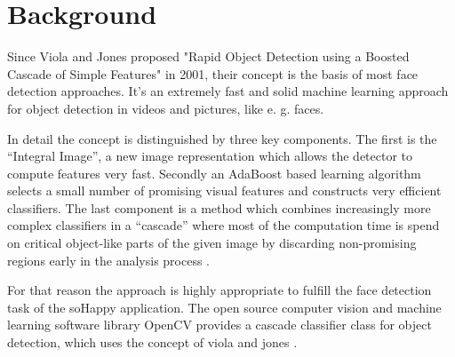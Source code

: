 \section{Background} \label{sec:background}
Since Viola and Jones proposed "Rapid Object Detection using a Boosted Cascade of Simple Features" in 2001, their concept is the basis of most face detection approaches.
It's an extremely fast and solid machine learning approach for object detection in videos and pictures, like e. g. faces.

In detail the concept is distinguished by three key components.
The first is the “Integral Image”, a new image representation which allows the detector to compute features very fast.
Secondly an AdaBoost based learning algorithm selects a small number of promising visual features and constructs very efficient classifiers.
The last component is a method which combines increasingly more complex classifiers in a “cascade” where most of the computation time is spend on critical object-like parts of the given image by discarding non-promising regions early in the analysis process \cite{viola_jones}.

For that reason the approach is highly appropriate to fulfill the face detection task of the soHappy application.
The open source computer vision and machine learning software library OpenCV provides a cascade classifier class for object detection, which uses the concept of viola and jones \cite{opencv_cascade_classifier}.

